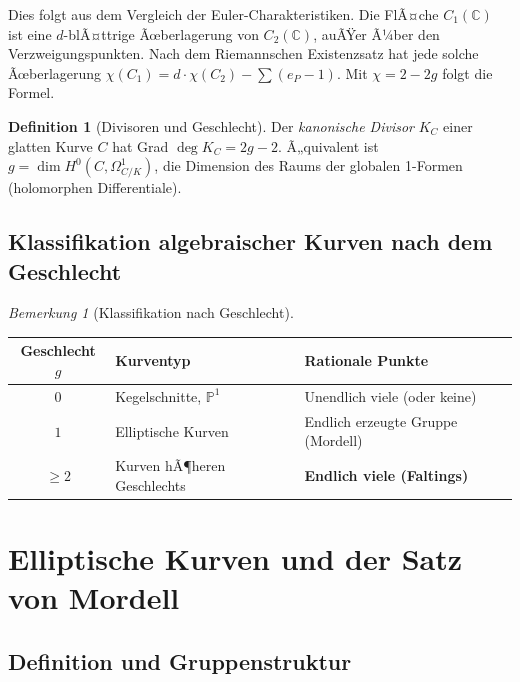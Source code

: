 ﻿\documentclass[12pt,a4paper]{article}
\theoremstyle{plain}
\theoremstyle{definition}
\newtheorem{definition}[theorem]{Definition}
\theoremstyle{remark}
\newtheorem{remark}[theorem]{Bemerkung}
\newenvironment{proof*}[1][Beweis]{%
  \begin{proof}[#1]\renewcommand{\qedsymbol}{$\blacksquare$}}
  {\end{proof}}
\newcommand{\C}{\mathbb{C}}
\begin{document}
\begin{proof*}
Dies folgt aus dem Vergleich der Euler-Charakteristiken. Die FlÃ¤che $C_1(\C)$ ist eine
$d$-blÃ¤ttrige Ãœberlagerung von $C_2(\C)$, auÃŸer Ã¼ber den Verzweigungspunkten.
Nach dem Riemannschen Existenzsatz hat jede solche Ãœberlagerung
$\chi(C_1) = d \cdot \chi(C_2) - \sum(e_P-1)$.
Mit $\chi = 2-2g$ folgt die Formel.
\end{proof*}

\begin{definition}[Divisoren und Geschlecht]\label{def:div}
Der \emph{kanonische Divisor} $K_C$ einer glatten Kurve $C$ hat Grad $\deg K_C = 2g-2$.
Ã„quivalent ist $g = \dim H^0(C, \Omega^1_{C/K})$, die Dimension des Raums
der globalen 1-Formen (holomorphen Differentiale).
\end{definition}

\subsection{Klassifikation algebraischer Kurven nach dem Geschlecht}

\begin{remark}[Klassifikation nach Geschlecht]\label{rem:klass_geschlecht}
\begin{center}
\begin{tabular}{cll}
\toprule
Geschlecht $g$ & Kurventyp & Rationale Punkte\\
\midrule
$0$ & Kegelschnitte, $\mathbb{P}^1$ & Unendlich viele (oder keine)\\
$1$ & Elliptische Kurven & Endlich erzeugte Gruppe (Mordell)\\
$\geq 2$ & Kurven hÃ¶heren Geschlechts & \textbf{Endlich viele (Faltings)}\\
\bottomrule
\end{tabular}
\end{center}
\end{remark}

\section{Elliptische Kurven und der Satz von Mordell}

\subsection{Definition und Gruppenstruktur}
\end{document}
